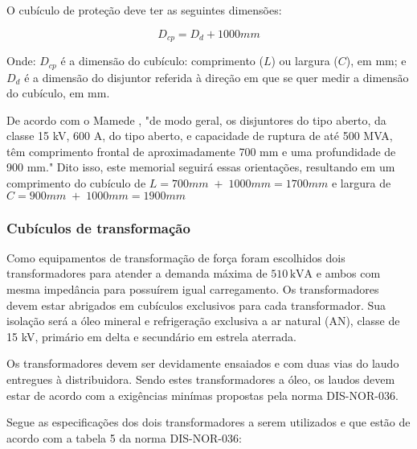 O cubículo de proteção deve ter as seguintes dimensões:

\begin{equation}
    D_{cp} = D_d + 1000mm
\end{equation}

Onde: $D_{cp}$ é a dimensão do cubículo: comprimento ($L$) ou largura ($C$), em mm; e $D_d$ é a dimensão do disjuntor referida à direção em que se quer medir a dimensão do cubículo, em mm.

De acordo com o Mamede \cite{mamede}, "de modo geral, os disjuntores do tipo aberto, da classe 15 kV, 600 A, do tipo aberto, e capacidade de ruptura de até 500 MVA, têm comprimento frontal de aproximadamente 700 mm e uma profundidade de 900 mm." Dito isso, este memorial seguirá essas orientações, resultando em um comprimento do cubículo de $L = 700mm \;+\; 1000mm = 1700mm$ e largura de $C = 900mm \;+\; 1000mm = 1900mm$

\subsubsection{Cubículos de transformação}

Como equipamentos de transformação de força foram escolhidos dois transformadores para atender a demanda máxima de $510 \, \text{kVA}$ e ambos com mesma impedância para possuírem igual carregamento. Os transformadores devem estar abrigados em cubículos exclusivos para cada transformador. Sua isolação será a óleo mineral e refrigeração exclusiva a ar natural (AN), classe de 15 kV, primário em delta e secundário em estrela aterrada.

Os transformadores devem ser devidamente ensaiados e com duas vias do laudo entregues à distribuidora. Sendo estes transformadores a óleo, os laudos devem estar de acordo com a exigências minímas propostas pela norma DIS-NOR-036.

Segue as especificações dos dois transformadores a serem utilizados e que estão de acordo com a tabela 5 da norma DIS-NOR-036:

